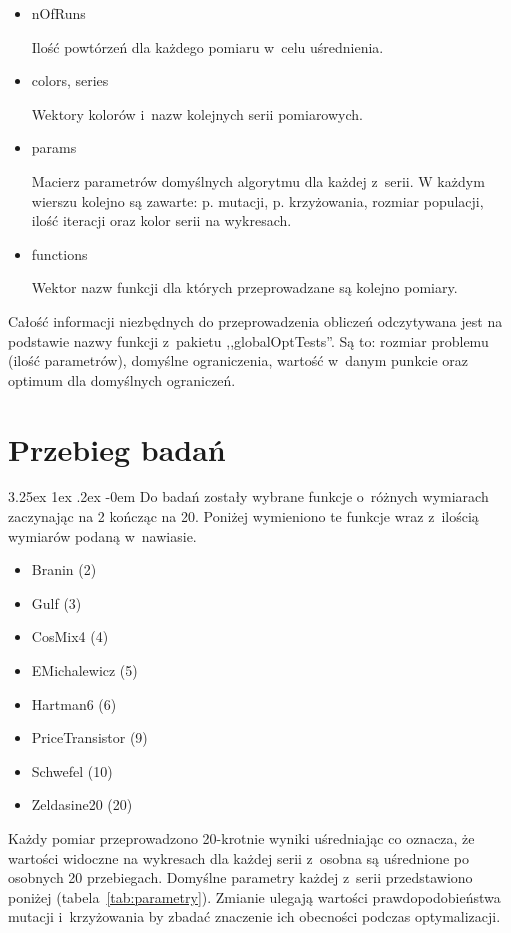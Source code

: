 \documentclass[11pt, a4paper]{article}
\makeatletter
\newcommand{\fbi}{\leavevmode{\parindent=1em\indent}}
\renewcommand\paragraph{\@startsection{paragraph}{5}{\z@}
  {3.25ex \@plus1ex \@minus.2ex}
  {-0em}
  {\normalfont\normalsize\bfseries}}
\makeatother
\begin{document}
\begin{itemize}
	\item nOfRuns
	
	Ilość powtórzeń dla każdego pomiaru w~celu uśrednienia.
	
	\item colors, series
	
	Wektory kolorów i~nazw kolejnych serii pomiarowych. 
	
	\item params
	
	Macierz parametrów domyślnych algorytmu dla każdej z~serii. W każdym wierszu kolejno są zawarte: p. mutacji, p. krzyżowania, rozmiar populacji, ilość iteracji oraz kolor serii na wykresach.
	
	\item functions
	
	Wektor nazw funkcji dla których przeprowadzane są kolejno pomiary.
	
\end{itemize}

Całość informacji niezbędnych do przeprowadzenia obliczeń odczytywana jest na podstawie nazwy funkcji z~pakietu ,,globalOptTests''. Są to: rozmiar problemu (ilość parametrów), domyślne ograniczenia, wartość w~danym punkcie oraz optimum dla domyślnych ograniczeń.

\newpage
\section{Przebieg badań}
\paragraph{}
Do badań zostały wybrane funkcje o~różnych wymiarach zaczynając na 2 kończąc na 20. Poniżej wymieniono te funkcje wraz z~ilością wymiarów podaną w~nawiasie.

\begin{itemize}
	\item Branin (2)
	\item Gulf (3)
	\item CosMix4 (4)
	\item EMichalewicz (5)
	\item Hartman6 (6)
	\item PriceTransistor (9)
	\item Schwefel (10)
	\item Zeldasine20 (20)
\end{itemize}

\fbi
Każdy pomiar przeprowadzono 20-krotnie wyniki uśredniając co oznacza, że wartości widoczne na wykresach dla każdej serii z~osobna są uśrednione po osobnych 20 przebiegach. Domyślne parametry każdej z~serii przedstawiono poniżej (tabela~\ref{tab:parametry}). Zmianie ulegają wartości  prawdopodobieństwa mutacji i~krzyżowania by zbadać znaczenie ich obecności podczas optymalizacji.
\end{document}

